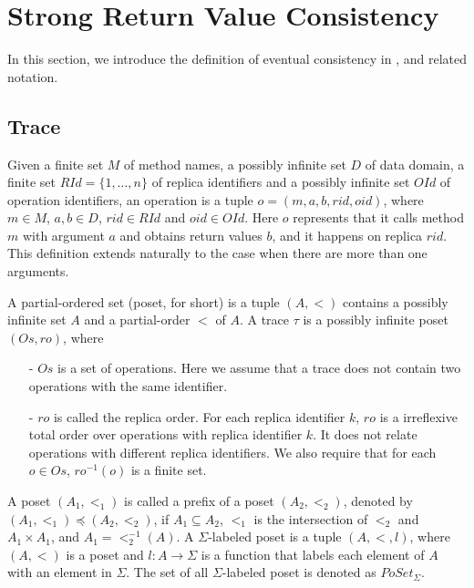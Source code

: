 \forget
{
\section{Strong Return Value Consistency}
\label{sec:strong return value consistency}

In this section, we introduce the definition of eventual consistency in \cite{Bouajjani:2014}, and related notation.


\subsection{Trace}
\label{subsec:trace}

Given a finite set $M$ of method names, a possibly infinite set $D$ of data domain, a finite set $RId=\{1,\ldots,n\}$ of replica identifiers and a possibly infinite set $OId$ of operation identifiers, an operation is a tuple $o=(m,a,b,rid,oid)$, where $m \in M$, $a,b \in D$, $rid \in RId$ and $oid \in OId$. Here $o$ represents that it calls method $m$ with argument $a$ and obtains return values $b$, and it happens on replica $rid$. This definition extends naturally to the case when there are more than one arguments.

A partial-ordered set (poset, for short) is a tuple $(A,<)$ contains a possibly infinite set $A$ and a partial-order $<$ of $A$. A trace $\tau$ is a possibly infinite poset $(Os,ro)$, where
\begin{itemize}
\setlength{\itemsep}{0.5pt}
\item[-] $Os$ is a set of operations. Here we assume that a trace does not contain two operations with the same identifier.

\item[-] $ro$ is called the replica order. For each replica identifier $k$, $ro$ is a irreflexive total order over operations with replica identifier $k$. It does not relate operations with different replica identifiers. We also require that for each $o \in Os$, $ro^{-1}(o)$ is a finite set.
\end{itemize}

A poset $(A_1,<_1)$ is called a prefix of a poset $(A_2,<_2)$, denoted by $(A_1,<_1) \preceq (A_2,<_2)$, if $A_1 \subseteq A_2$, $<_1$ is the intersection of $<_2$ and $A_1 \times A_1$, and $A_1 = <_2^{-1}(A)$. A $\Sigma$-labeled poset is a tuple $(A,<,l)$, where $(A,<)$ is a poset and $l:A \rightarrow \Sigma$ is a function that labels each element of $A$ with an element in $\Sigma$. The set of all $\Sigma$-labeled poset is denoted as $PoSet_{\Sigma}$.


}
